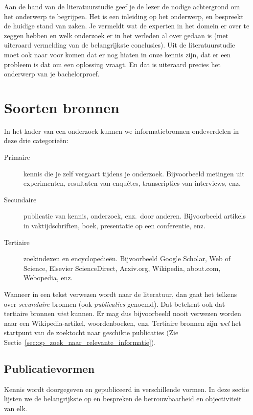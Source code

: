 Aan de hand van de literatuurstudie geef je de lezer de nodige achtergrond om het onderwerp te begrijpen. Het is een inleiding op het onderwerp, en bespreekt de huidige stand van zaken. Je vermeldt wat de experten in het domein er over te zeggen hebben en welk onderzoek er in het verleden al over gedaan is (met uiteraard vermelding van de belangrijkste conclusies). Uit de literatuurstudie moet ook naar voor komen dat er nog hiaten in onze kennis zijn, dat er een probleem is dat om een oplossing vraagt. En dat is uiteraard precies het onderwerp van je bachelorproef.

\section{Soorten bronnen}
\label{sec:soorten-bronnen}

In het kader van een onderzoek kunnen we informatiebronnen ondeverdelen in deze drie categorieën:

\begin{description}
  \item[Primaire] kennis die je zelf vergaart tijdens je onderzoek. Bijvoorbeeld metingen uit experimenten, resultaten van enquêtes, transcripties van interviews, enz.
  \item[Secundaire] publicatie van kennis, onderzoek, enz.~door anderen. Bijvoorbeeld artikels in vaktijdschriften, boek, presentatie op een conferentie, enz.
  \item[Tertiaire] zoekindexen en encyclopedieën. Bijvoorbeeld Google Scholar, Web of Science, Elsevier ScienceDirect, Arxiv.org, Wikipedia, about.com, Webopedia, enz.
\end{description}

Wanneer in een tekst verwezen wordt naar de literatuur, dan gaat het telkens over \emph{secundaire} bronnen (ook \emph{publicaties} genoemd). Dat betekent ook dat tertiaire bronnen \emph{niet} kunnen. Er mag dus bijvoorbeeld nooit verwezen worden naar een Wikipedia-artikel, woordenboeken, enz. Tertiaire bronnen zijn \emph{wel} het startpunt van de zoektocht naar geschikte publicaties (Zie Sectie~\ref{sec:op_zoek_naar_relevante_informatie}).

\subsection{Publicatievormen}
\label{sub:publicatievormen}

Kennis wordt doorgegeven en gepubliceerd in verschillende vormen. In deze sectie lijsten we de belangrijkste op en bespreken de betrouwbaarheid en objectiviteit van elk.

